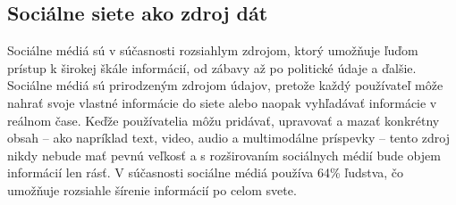 \documentclass[]{tukediphc}
\begin{document}
\begin{table}[H]
\centering
\caption{Metódy detekcie vizuálneho obsahu generovaného AI (Obrázky)}
\label{tab:visual_detection_methods}
\end{table}




\subsection{Sociálne siete ako zdroj dát}
Sociálne médiá sú v súčasnosti rozsiahlym zdrojom, ktorý umožňuje ľuďom prístup k širokej škále informácií, od zábavy až po politické údaje a ďalšie. Sociálne médiá sú prirodzeným zdrojom údajov, pretože každý používateľ môže nahrať svoje vlastné informácie do siete alebo naopak vyhľadávať informácie v reálnom čase. Keďže používatelia môžu pridávať, upravovať a mazať konkrétny obsah – ako napríklad text, video, audio a multimodálne príspevky – tento zdroj nikdy nebude mať pevnú veľkosť a s rozširovaním sociálnych médií bude objem informácií len rásť. V súčasnosti sociálne médiá používa 64\% ľudstva, čo umožňuje rozsiahle šírenie informácií po celom svete\cite{researchgate:socialmedia}. 
\end{document}
